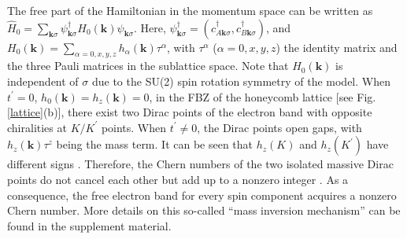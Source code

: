 \documentclass[amsmath,superscriptaddress,showpacs,aps,prl,twocolumn]{revtex4-1}
\begin{document}
\par The free part of the Hamiltonian in the momentum space can be written as $\hat{H}_0=\sum_{\mathbf{k}\sigma}\psi^{\dagger}_{\mathbf{k}\sigma}H_0(\mathbf{k})\psi_{\mathbf{k}\sigma}$. Here, $\psi^{\dagger}_{\mathbf{k}\sigma}=(c^{\dagger}_{A\mathbf{k}\sigma},c^{\dagger}_{B\mathbf{k}\sigma})$, and $H_0(\mathbf{k})=\sum_{\alpha=0,x,y,z}h_\alpha(\mathbf{k})\tau^\alpha$, with $\tau^\alpha$ ($\alpha=0,x,y,z$) the identity matrix and the three Pauli matrices in the sublattice space. Note that $H_0(\mathbf{k})$ is independent of $\sigma$ due to the SU(2) spin rotation symmetry of the model. When $t^\prime=0$, $h_0(\mathbf{k})=h_z(\mathbf{k})=0$, in the FBZ of the honeycomb lattice [see Fig. \ref{lattice}(b)], there exist two Dirac points of the electron band with opposite chiralities at $K/K^\prime$ points. When $t^\prime\ne0$, the Dirac points open gaps, with $h_z(\mathbf{k})\tau^z$ being the mass term. It can be seen that $h_z(K)$ and $h_z(K^\prime)$ have different signs \cite{Haldane_PRL1988}. Therefore, the Chern numbers of the two isolated massive Dirac points do not cancel each other but add up to a nonzero integer \cite{Rachel_RPP2018}. As a consequence, the free electron band for every spin component acquires a nonzero Chern number. More details on this so-called ``mass inversion mechanism'' can be found in the supplement material.



\end{document}
